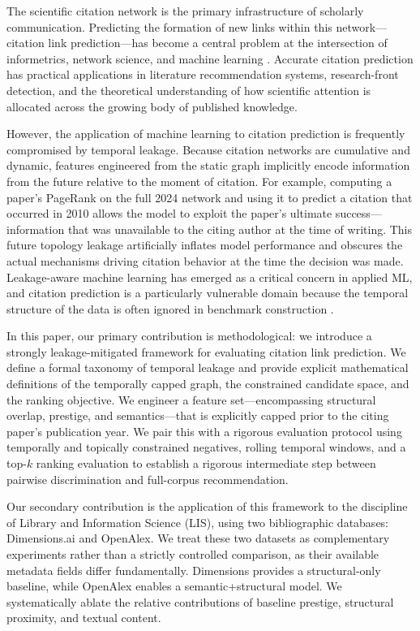 \documentclass[11pt,a4paper]{article}
\begin{document}
The scientific citation network is the primary infrastructure of scholarly communication. Predicting the formation of new links within this network---citation link prediction---has become a central problem at the intersection of informetrics, network science, and machine learning \citep{wang2013quantifying, shibata2012link}. Accurate citation prediction has practical applications in literature recommendation systems, research-front detection, and the theoretical understanding of how scientific attention is allocated across the growing body of published knowledge.

However, the application of machine learning to citation prediction is frequently compromised by temporal leakage. Because citation networks are cumulative and dynamic, features engineered from the static graph implicitly encode information from the future relative to the moment of citation. For example, computing a paper's PageRank on the full 2024 network and using it to predict a citation that occurred in 2010 allows the model to exploit the paper's ultimate success---information that was unavailable to the citing author at the time of writing. This future topology leakage artificially inflates model performance and obscures the actual mechanisms driving citation behavior at the time the decision was made. Leakage-aware machine learning has emerged as a critical concern in applied ML, and citation prediction is a particularly vulnerable domain because the temporal structure of the data is often ignored in benchmark construction \citep{fortunato2018science}.

In this paper, our primary contribution is methodological: we introduce a strongly leakage-mitigated framework for evaluating citation link prediction. We define a formal taxonomy of temporal leakage and provide explicit mathematical definitions of the temporally capped graph, the constrained candidate space, and the ranking objective. We engineer a feature set---encompassing structural overlap, prestige, and semantics---that is explicitly capped prior to the citing paper's publication year. We pair this with a rigorous evaluation protocol using temporally and topically constrained negatives, rolling temporal windows, and a top-$k$ ranking evaluation to establish a rigorous intermediate step between pairwise discrimination and full-corpus recommendation.

Our secondary contribution is the application of this framework to the discipline of Library and Information Science (LIS), using two bibliographic databases: Dimensions.ai and OpenAlex. We treat these two datasets as complementary experiments rather than a strictly controlled comparison, as their available metadata fields differ fundamentally. Dimensions provides a structural-only baseline, while OpenAlex enables a semantic+structural model. We systematically ablate the relative contributions of baseline prestige, structural proximity, and textual content. 
\end{document}
